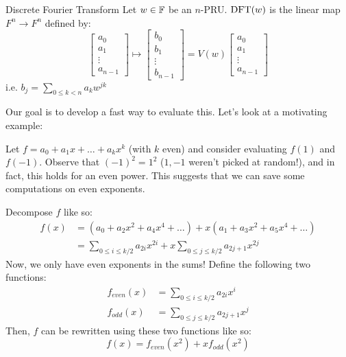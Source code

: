 \begin{definition}{Discrete Fourier Transform}{}
    Let $w \in \operatorname{\mathbb{F}}$ be an $n$-PRU. $\operatorname{DFT}(w)$ is the linear map $F^n \rightarrow F^n$ defined by:
    \begin{equation}
        \begin{bmatrix}
            a_0 \\ a_1 \\ \vdots \\ a_{n-1}
        \end{bmatrix}
        \longmapsto
        \begin{bmatrix}
            b_0 \\ b_1 \\ \vdots \\ b_{n-1}
        \end{bmatrix}
        =
        V(w)
        \begin{bmatrix}
            a_0 \\ a_1 \\ \vdots \\ a_{n-1}
        \end{bmatrix}
    \end{equation}
    i.e. $b_j = \sum_{0 \leq k < n} a_kw^{jk}$
\end{definition}

Our goal is to develop a fast way to evaluate this.
Let's look at a motivating example:

Let $f = a_0 + a_1x + \ldots + a_kx^k$ (with $k$ even) and consider evaluating $f(1)$ and $f(-1)$.
Observe that $(-1)^2 = 1^2$ ($1, -1$ weren't picked at random!), and in fact, this holds for an even power.
This suggests that we can save some computations on even exponents.

Decompose $f$ like so:
\begin{align*}
    f(x) &= (a_0 + a_2x^2 + a_4x^4 + \ldots) + x(a_1 + a_3x^2 + a_5x^4 + \ldots) \\
    &= \sum_{0 \leq i \leq k/2} a_{2i}x^{2i} + x\sum_{0 \leq j \leq k/2} a_{2j + 1}x^{2j}
\end{align*}
Now, we only have even exponents in the sums!
Define the following two functions:
\begin{align}
    f_{even}(x) &= \sum_{0 \leq i \leq k/2} a_{2i}x^{i} \\
    f_{odd}(x) &= \sum_{0 \leq j \leq k/2} a_{2j + 1}x^{j}
\end{align}
Then, $f$ can be rewritten using these two functions like so:
\begin{equation}\label{eq:lec6-function-decompose}
    f(x) = f_{even}(x^2) + xf_{odd}(x^2)
\end{equation}

